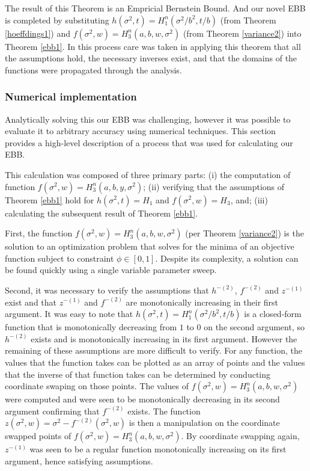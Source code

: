 The result of this Theorem is an Empricial Bernstein Bound. And our novel EBB is completed by substituting  $h(\sigma^2,t)=H_1^n\left(\sigma^2/b^2,t/b\right)$ (from Theorem \ref{hoeffdings1}) and $f(\sigma^2,w)=H_3^n\left(a,b,w,\sigma^2\right)$ (from Theorem \ref{variance2}) into Theorem \ref{ebb1}.
In this process care was taken in applying this theorem that all the assumptions hold, the necessary inverses exist, and that the domains of the functions were propagated through the analysis.




\subsubsection{Numerical implementation}
\label{numerical-implementation}
Analytically solving this our EBB was challenging, however it was possible to evaluate it to arbitrary accuracy using numerical techniques.
This section provides a high-level description of a process that was used for calculating our EBB.

This calculation was composed of three primary parts:
(i) the computation of function $f(\sigma^2,w)=H_3^n(a,b,y,\sigma^2)$;
(ii) verifying that the assumptions of Theorem \ref{ebb1} hold for $h(\sigma^2,t)=H_1$ and $f(\sigma^2,w)=H_3$, and;
(iii) calculating the subsequent result of Theorem \ref{ebb1}.

First, the function $f(\sigma^2,w)=H_3^n(a,b,w,\sigma^2)$ (per Theorem \ref{variance2}) is the solution to an optimization problem that solves for the minima of an objective function subject to constraint $\phi\in[0,1]$.
Despite its complexity, a solution can be found quickly using a single variable parameter sweep.

Second, it was necessary to verify the assumptions that $h^{-(2)}$, $f^{-(2)}$ and $z^{-(1)}$ exist and that $z^{-(1)}$ and $f^{-(2)}$ are monotonically increasing in their first argument.
It was easy to note that $h(\sigma^2,t)=H_1^n\left(\sigma^2/b^2,t/b\right)$ is a closed-form function that is monotonically decreasing from $1$ to $0$ on the second argument, so $h^{-(2)}$ exists and is monotonically increasing in its first argument.  However the remaining of these assumptions are more difficult to verify.
For any function, the values that the function takes can be plotted as an array of points and the values that the inverse of that function takes can be determined by conducting coordinate swaping on those points.
The values of $f(\sigma^2,w)=H_3^n(a,b,w,\sigma^2)$ were computed and were seen to be monotonically decreasing in its second argument confirming that $f^{-(2)}$ exists.
The function $z(\sigma^2,w)=\sigma^2-f^{-(2)}\left(\sigma^2,w\right)$ is then a manipulation on the coordinate swapped points of $f(\sigma^2,w)=H_3^n(a,b,w,\sigma^2)$.
By coordinate swapping again, $z^{-(1)}$ was seen to be a regular function monotonically increasing on its first argument, hence satisfying assumptions.


